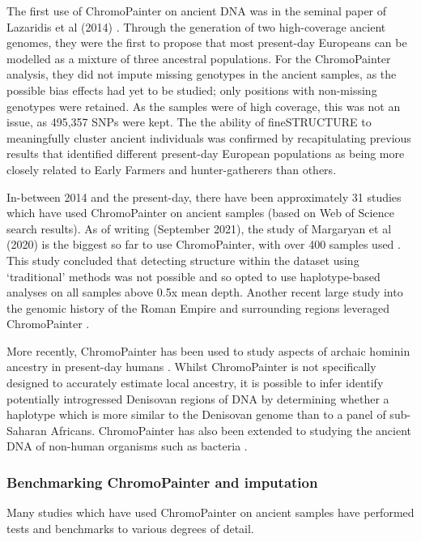 The first use of ChromoPainter on ancient DNA was in the seminal paper of Lazaridis et al (2014) \cite{Lazaridis2014}. Through the generation of two high-coverage ancient genomes, they were the first to propose that most present-day Europeans can be modelled as a mixture of three ancestral populations. For the ChromoPainter analysis, they did not impute missing genotypes in the ancient samples, as the possible bias effects had yet to be studied; only positions with non-missing genotypes were retained. As the samples were of high coverage, this was not an issue, as 495,357 SNPs were kept. The the ability of fineSTRUCTURE to meaningfully cluster ancient individuals was confirmed by recapitulating previous results that identified different present-day European populations as being more closely related to Early Farmers and hunter-gatherers than others. 

In-between 2014 and the present-day, there have been approximately 31 studies which have used ChromoPainter on ancient samples (based on Web of Science search results). As of writing (September 2021), the study of Margaryan et al (2020) is the biggest so far to use ChromoPainter, with over 400 samples used \cite{margaryan2020population}. This study concluded that detecting structure within the dataset using `traditional' methods was not possible and so opted to use haplotype-based analyses on all samples above 0.5x mean depth. Another recent large study into the genomic history of the Roman Empire and surrounding regions leveraged ChromoPainter \cite{antonio2019ancient}.

More recently, ChromoPainter has been used to study aspects of archaic hominin ancestry in present-day humans \cite{JACOBS20191010, teixeira2021widespread}. Whilst ChromoPainter is not specifically designed to accurately estimate local ancestry, it is possible to infer identify potentially introgressed Denisovan regions of DNA by determining whether a haplotype which is more similar to the Denisovan genome than to a panel of sub-Saharan Africans. ChromoPainter has also been extended to studying the ancient DNA of non-human organisms such as bacteria \cite{Moodleye2015523118}. 

\subsubsection{Benchmarking ChromoPainter and imputation}

Many studies which have used ChromoPainter on ancient samples have performed tests and benchmarks to various degrees of detail. 

